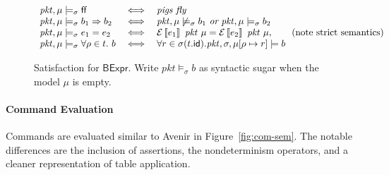 \documentclass{article}
\newcommand{\pkt}{\mathit{pkt}}
\newcommand{\denote}[1]{\left\llbracket#1\right\rrbracket}
\newcommand{\edenote}[1]{\mathcal{E}\denote{#1}}
\newcommand{\FALSE}{\mathsf{ff}}
\newcommand{\BExpr}{\mathsf{BExpr}}
\newcommand{\id}{\mathsf{id}}
\begin{document}
\begin{figure}
  \[\begin{array}{l>{\iff}cl}
  \pkt,\mu \models_\sigma \FALSE && \textit{pigs fly} \\
  \pkt,\mu \models_\sigma b_1 \Rightarrow b_2 &&
  \pkt,\mu \not\models_\sigma b_1~\textit{or}~
  \pkt,\mu \models_\sigma b_2\\
  \pkt,\mu \models_\sigma e_1 = e_2 &&
  \edenote{e_1}~\pkt~\mu = \edenote{e_2}~\pkt~\mu, \qquad
  \text{(note strict semantics)} \\
  \pkt,\mu \models_\sigma \forall \rho \in t. ~b &&
  \forall r \in \sigma(t.\id).
  \pkt,\sigma,\mu[\rho \mapsto r] \models b
  \end{array}
  \]
  \caption{Satisfaction for $\BExpr$. Write $\pkt \models_\sigma b$ as syntactic
    sugar when the model $\mu$ is empty.}
  \label{fig:bool-satis}
\end{figure}

\paragraph{Command Evaluation}
Commands are evaluated similar to Avenir in Figure~\ref{fig:com-sem}. The
notable differences are the inclusion of assertions, the nondeterminism
operators, and a cleaner representation of table application.
\end{document}
